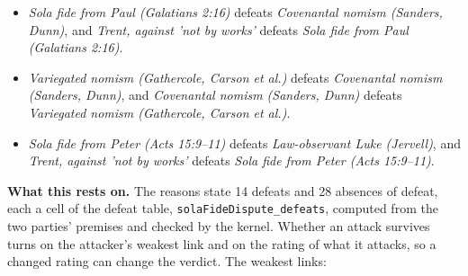 \documentclass[11pt]{article}
\begin{document}
\begin{itemize}
\begin{itemize}
\item \emph{Sola fide from Paul (Galatians 2:16)} defeats \emph{Covenantal nomism (Sanders, Dunn)}, and \emph{Trent, against 'not by works'} defeats \emph{Sola fide from Paul (Galatians 2:16)}.
\item \emph{Variegated nomism (Gathercole, Carson et al.)} defeats \emph{Covenantal nomism (Sanders, Dunn)}, and \emph{Covenantal nomism (Sanders, Dunn)} defeats \emph{Variegated nomism (Gathercole, Carson et al.)}.
\item \emph{Sola fide from Peter (Acts 15:9–11)} defeats \emph{Law-observant Luke (Jervell)}, and \emph{Trent, against 'not by works'} defeats \emph{Sola fide from Peter (Acts 15:9–11)}.
\end{itemize}
\end{itemize}
\par\noindent\textbf{What this rests on.} The reasons state 14 defeats and 28 absences of defeat, each a cell of the defeat table, \texttt{sola\allowbreak{}Fide\allowbreak{}Dispute\_\allowbreak{}defeats}, computed from the two parties' premises and checked by the kernel. Whether an attack survives turns on the attacker's weakest link and on the rating of what it attacks, so a changed rating can change the verdict. The weakest links:
\end{document}
